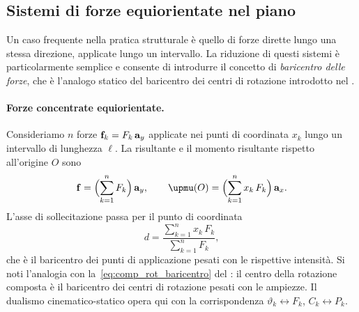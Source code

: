 \subsection{Sistemi di forze equiorientate nel piano}

Un caso frequente nella pratica strutturale è quello di forze
dirette lungo una stessa direzione, applicate lungo un
intervallo. La riduzione di questi sistemi è particolarmente
semplice e consente di introdurre il concetto di
\textit{baricentro delle forze}, che è l'analogo statico del
baricentro dei centri di rotazione introdotto nel .

\paragraph{Forze concentrate equiorientate.}
Consideriamo $n$ forze $\mathbf{f}_k = F_k\,\mathbf{a}_y$ applicate nei
punti di coordinata $x_k$ lungo un intervallo di lunghezza
$\ell$. La risultante e il momento risultante rispetto
all'origine $O$ sono
\begin{equation}
	\fb = \Bigl(\sum_{k=1}^{n} F_k\Bigr)\,\ab_y, \qquad
	\bm{\upmu}(O) = \Bigl(\sum_{k=1}^{n} x_k\,F_k\Bigr)
	\,\ab_x.
\end{equation}
L'asse di sollecitazione passa per il punto di coordinata
\begin{equation}\label{eq:baricentro_forze}
	d = \frac{\displaystyle\sum_{k=1}^{n} x_k\,F_k}
	{\displaystyle\sum_{k=1}^{n} F_k},
\end{equation}
che è il baricentro dei punti di applicazione pesati con le
rispettive intensità. Si noti l'analogia con
la~\eqref{eq:comp_rot_baricentro} del : il
centro della rotazione composta è il baricentro dei centri
di rotazione pesati con le ampiezze. Il dualismo
cinematico-statico opera qui con la corrispondenza
$\vartheta_k \leftrightarrow F_k$,
$C_k \leftrightarrow P_k$.

